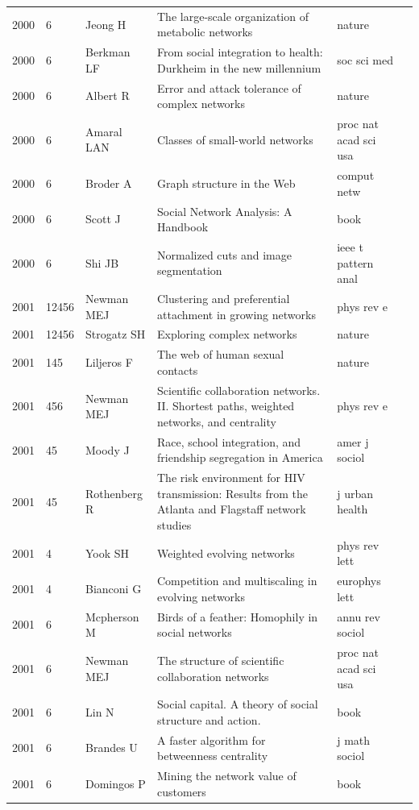 \documentclass[11pt]{article} %
\begin{document}
\begin{landscape}
\begin{longtable}{p{0.7cm}|p{0.8cm}|p{3cm}|p{14.5cm}|p{3.5cm}l}
2000& 	6& 	 Jeong H& 	 The large-scale organization of metabolic networks& 	 nature\\
2000& 	6& 	 Berkman LF& 	 From social integration to health: Durkheim in the new millennium& 	 soc sci med\\
2000& 	6& 	 Albert R& 	 Error and attack tolerance of complex networks& 	 nature\\
2000& 	6& 	 Amaral LAN& 	 Classes of small-world networks& 	 proc nat acad sci usa\\
2000& 	6& 	 Broder A& 	 Graph structure in the Web& 	 comput netw\\
2000& 	6& 	 Scott J& 	 Social Network Analysis: A Handbook& 	 book\\
2000& 	6& 	 Shi JB& 	 Normalized cuts and image segmentation& 	 ieee t pattern anal\\
2001& 	12456& 	 Newman MEJ& 	 Clustering and preferential attachment in growing networks& 	 phys rev e\\
2001& 	12456& 	 Strogatz SH& 	 Exploring complex networks& 	 nature\\
2001& 	145& 	 Liljeros F& 	 The web of human sexual contacts& 	 nature\\
2001& 	456& 	 Newman MEJ& 	 Scientific collaboration networks. II. Shortest paths, weighted networks, and centrality& 	 phys rev e\\
2001& 	45& 	 Moody J& 	 Race, school integration, and friendship segregation in America& 	 amer j sociol\\
2001& 	45& 	 Rothenberg R& 	 The risk environment for HIV transmission: Results from the Atlanta and Flagstaff network studies& 	 j urban health\\
2001& 	4& 	 Yook SH& 	 Weighted evolving networks& 	 phys rev lett\\
2001& 	4& 	 Bianconi G& 	 Competition and multiscaling in evolving networks& 	 europhys lett\\
2001& 	6& 	 Mcpherson M& 	 Birds of a feather: Homophily in social networks& 	 annu rev sociol\\
2001& 	6& 	 Newman MEJ& 	 The structure of scientific collaboration networks& 	 proc nat acad sci usa\\
2001& 	6& 	 Lin N& 	 Social capital. A theory of social structure and action.& 	 book\\
2001& 	6& 	 Brandes U& 	 A faster algorithm for betweenness centrality& 	 j math sociol\\
2001& 	6& 	 Domingos P& 	 Mining the network value of customers& 	 book\\

\end{longtable}
\end{landscape}
\end{document}
